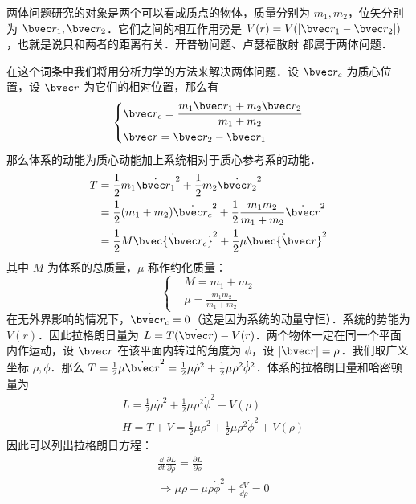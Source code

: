 

两体问题研究的对象是两个可以看成质点的物体，质量分别为 $m_1,m_2$，位矢分别为 $\bvec r_1,\bvec r_2$．它们之间的相互作用势是 $V(r)=V(|\bvec r_1-\bvec r_2|)$，也就是说只和两者的距离有关．开普勒问题、卢瑟福散射 都属于两体问题．

在这个词条中我们将用分析力学的方法来解决两体问题．设 $\bvec r_c$ 为质心位置，设 $\bvec r$ 为它们的相对位置，那么有
\begin{equation}
\left\{
\begin{aligned}
&\bvec r_c=\frac{m_1\bvec r_1+ m_2\bvec r_2}{m_1+m_2}\\
&\bvec r=\bvec r_2-\bvec r_1
\end{aligned}
\right.
\end{equation}
那么体系的动能为质心动能加上系统相对于质心参考系的动能．
\begin{equation}
\begin{aligned}
T&=\frac{1}{2}m_1 \dot{\bvec r_1}^2+\frac{1}{2}m_2 \dot{\bvec r_2}^2\\
&=\frac{1}{2}(m_1+m_2)\dot{\bvec r_c}^2+\frac{1}{2}\frac{m_1m_2}{m_1+m_2}\dot{\bvec r}^2\\
&=\frac{1}{2}M \dot{\bvec{\bvec r_c}}^2+\frac{1}{2}\mu \dot{\bvec{\bvec r}}^2
\end{aligned}
\end{equation}
其中 $M$ 为体系的总质量，$\mu$ 称作约化质量：
\begin{equation}
\left\{
\begin{aligned}
&M=m_1+m_2\\
&\mu=\frac{m_1m_2}{m_1+m_2}
\end{aligned}
\right.
\end{equation}
在无外界影响的情况下，$\dot{\bvec r_c}=0$（这是因为系统的动量守恒）．系统的势能为 $V(r)$．因此拉格朗日量为 $L=T(\dot{\bvec r})-V(r)$．两个物体一定在同一个平面内作运动，设 $\bvec r$ 在该平面内转过的角度为 $\phi$，设 $|\bvec r|=\rho$．我们取广义坐标 $\rho,\phi$．那么 $T=\frac{1}{2}\mu \dot{\bvec r}^2=\frac{1}{2}\mu \dot \rho^2+\frac{1}{2}\mu \rho^2\dot\phi^2$．体系的拉格朗日量和哈密顿量为
\begin{equation}
\begin{aligned}
&L=\frac{1}{2}\mu \dot \rho^2+\frac{1}{2}\mu \rho^2\dot\phi^2-V(\rho)\\
&H=T+V=\frac{1}{2}\mu \dot \rho^2+\frac{1}{2}\mu \rho^2\dot\phi^2+V(\rho)
\end{aligned}
\end{equation}
因此可以列出拉格朗日方程：
\begin{equation}\label{twoobj_eq1}
\begin{aligned}
&\frac{\dd }{\dd t}\frac{\partial L}{\partial \dot\rho}=\frac{\partial L}{\partial \rho}\\&\Rightarrow \mu\ddot\rho-\mu\rho\dot\phi^2+\frac{\dd V}{\dd \rho}=0
\end{aligned}
\end{equation}

